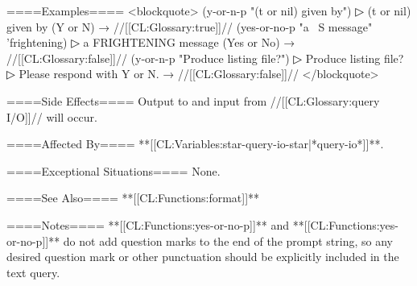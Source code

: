 ====Examples====
<blockquote> (y-or-n-p "(t or nil) given by")
▷ (t or nil) given by (Y or N)  → //[[CL:Glossary:true]]// (yes-or-no-p "a ~S message" 'frightening)
▷ a FRIGHTENING message (Yes or No)  → //[[CL:Glossary:false]]// (y-or-n-p "Produce listing file?")
▷ Produce listing file?
▷ Please respond with Y or N.  → //[[CL:Glossary:false]]// </blockquote>

====Side Effects====
Output to and input from //[[CL:Glossary:query I/O]]// will occur.

====Affected By====
**[[CL:Variables:star-query-io-star|*query-io*]]**.

====Exceptional Situations====
None.

====See Also====
**[[CL:Functions:format]]**

====Notes====
**[[CL:Functions:yes-or-no-p]]** and **[[CL:Functions:yes-or-no-p]]** do not add question marks to the end of the prompt string, so any desired question mark or other punctuation should be explicitly included in the text query.

